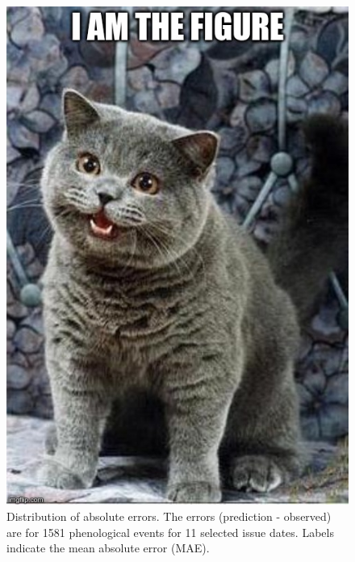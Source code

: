 \begin{figure}
	\centering
		\includegraphics[scale=0.3]{images/figure_filler.jpg}
	\caption[Distribution of absolute errors]{Distribution of absolute errors. The errors (prediction - observed) are for 1581 phenological events for 11 selected issue dates. Labels indicate the mean absolute error (MAE).} \label{fig-4-5}
\end{figure}